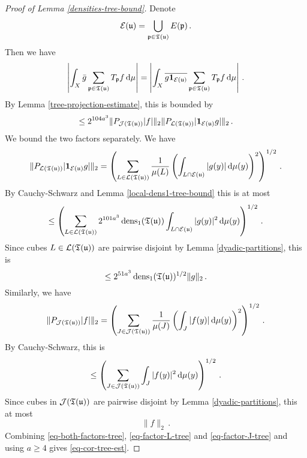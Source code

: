 {\begin{proof}[Proof of Lemma \ref{densities-tree-bound}]
    Denote
    $$
        \mathcal{E}({\mathfrak u}) = \bigcup_{{\mathfrak p} \in {\mathfrak T}({\mathfrak u})} E({\mathfrak p})\,.
    $$
    Then we have
    $$
        \left| \int_X \bar g \sum_{{\mathfrak p} \in {\mathfrak T}({\mathfrak u})} T_{{\mathfrak p}} f \, \mathrm{d}\mu \right|  = \left| \int_X \overline{ g\mathbf{1}_{\mathcal{E}({\mathfrak u})}}  \sum_{{\mathfrak p} \in {\mathfrak T}({\mathfrak u})} T_{{\mathfrak p}} f \, \mathrm{d}\mu \right|\,.
    $$
    By Lemma \ref{tree-projection-estimate}, this is bounded by
    \begin{equation}
        \label{eq-both-factors-tree}
        \le 2^{104a^3}\|P_{\mathcal{J}({\mathfrak T}({\mathfrak u}))}|f|\|_2 \|P_{\mathcal{L}({\mathfrak T}({\mathfrak u}))} |\mathbf{1}_{\mathcal{E}({\mathfrak u})}g|\|_2\,.
    \end{equation}
    We bound the two factors separately.
    We have
    $$
        \|P_{\mathcal{L}({\mathfrak T}({\mathfrak u}))} |\mathbf{1}_{\mathcal{E}({\mathfrak u})}g|\|_2 = \left( \sum_{L \in \mathcal{L}({\mathfrak T}({\mathfrak u}))} \frac{1}{\mu(L)} \left(\int_{L \cap \mathcal{E}({\mathfrak u})} |g(y)| \, \mathrm{d}\mu(y)\right)^2 \right)^{1/2}\,.
    $$
    By Cauchy-Schwarz and Lemma \ref{local-dens1-tree-bound} this is at most
    $$
        \le \left( \sum_{L \in \mathcal{L}({\mathfrak T}({\mathfrak u}))} 2^{101a^3} \operatorname{\operatorname{dens}}_1({\mathfrak T}({\mathfrak u})) \int_{L \cap \mathcal{E}({\mathfrak u})} |g(y)|^2 \, \mathrm{d}\mu(y) \right)^{1/2}\,.
    $$
    Since cubes $L \in \mathcal{L}({\mathfrak T}({\mathfrak u}))$ are pairwise disjoint by Lemma \ref{dyadic-partitions}, this is
    \begin{equation}
        \label{eq-factor-L-tree}
         \le 2^{51 a^3} \operatorname{\operatorname{dens}}_1({\mathfrak T}({\mathfrak u}))^{1/2} \|g\|_2\,.
    \end{equation}
    Similarly, we have
    \begin{equation}
        \label{eq-cor-tree-proof}
        \|P_{\mathcal{J}({\mathfrak T}({\mathfrak u}))}|f|\|_2  = \left( \sum_{J \in \mathcal{J}({\mathfrak T}({\mathfrak u}))} \frac{1}{\mu(J)} \left(\int_J |f(y)| \, \mathrm{d}\mu(y)\right)^2 \right)^{1/2}\,.
    \end{equation}
    By Cauchy-Schwarz, this is
    $$
        \le \left( \sum_{J \in \mathcal{J}({\mathfrak T}({\mathfrak u}))} \int_J |f(y)|^2 \, \mathrm{d}\mu(y) \right)^{1/2}\,.
    $$
    Since cubes in $\mathcal{J}({\mathfrak T}({\mathfrak u}))$ are pairwise disjoint by Lemma \ref{dyadic-partitions}, this at most
    \begin{equation}
        \label{eq-factor-J-tree}
        \|f\|_2\,.
    \end{equation}
    Combining \eqref{eq-both-factors-tree}, \eqref{eq-factor-L-tree} and \eqref{eq-factor-J-tree} and using $a \ge 4$ gives \eqref{eq-cor-tree-est}.


\end{proof}}
